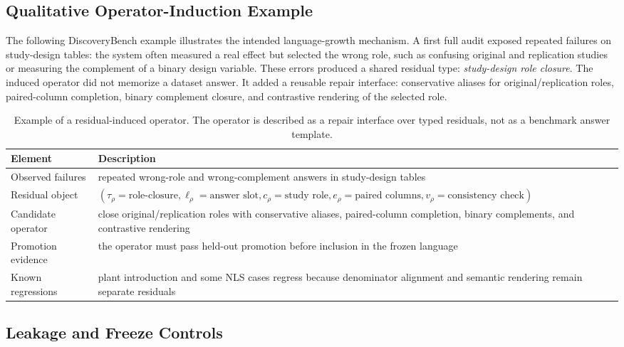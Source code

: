 \documentclass[letterpaper]{article}
\renewcommand{\arraystretch}{1.10}
\newcommand{\tblhdr}{\rowcolor{headerrow}}
\begin{document}
\subsection*{Qualitative Operator-Induction Example}

The following DiscoveryBench example illustrates the intended language-growth
mechanism. A first full audit exposed repeated failures on study-design tables:
the system often measured a real effect but selected the wrong role, such as
confusing original and replication studies or measuring the complement of a
binary design variable. These errors produced a shared residual type:
\emph{study-design role closure}. The induced operator did not memorize a
dataset answer. It added a reusable repair interface: conservative aliases for
original/replication roles, paired-column completion, binary complement
closure, and contrastive rendering of the selected role.

\begin{table}[H]
\centering
\caption{Example of a residual-induced operator. The operator is described as a
repair interface over typed residuals, not as a benchmark answer template.}
\label{tab:operator_example}
\footnotesize
\setlength{\tabcolsep}{5pt}
\renewcommand{\arraystretch}{0.96}
\begin{tabularx}{0.96\textwidth}{@{}lY@{}}
\toprule
\tblhdr
Element & Description \\
\midrule
Observed failures & repeated wrong-role and wrong-complement answers in study-design tables \\
Residual object & $(\tau_\rho=\text{role-closure},\ell_\rho=\text{answer slot},c_\rho=\text{study role},e_\rho=\text{paired columns},v_\rho=\text{consistency check})$ \\
Candidate operator & close original/replication roles with conservative aliases, paired-column completion, binary complements, and contrastive rendering \\
Promotion evidence & the operator must pass held-out promotion before inclusion in the frozen language \\
Known regressions & plant introduction and some NLS cases regress because denominator alignment and semantic rendering remain separate residuals \\
\bottomrule
\end{tabularx}
\end{table}

\subsection*{Leakage and Freeze Controls}
\end{document}
